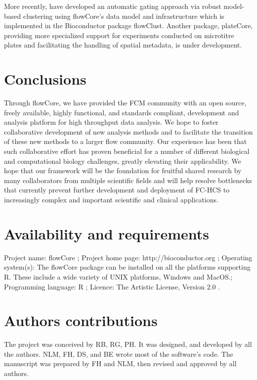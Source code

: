 \documentclass[10pt]{bmc_article}
\newcommand{\Rpackage}[1]{{\textsf{#1}}}
\newenvironment{bmcformat}{\begin{raggedright}\baselineskip20pt\sloppy\setboolean{publ}{false}}{\end{raggedright}\baselineskip20pt\sloppy}
\begin{document}
\begin{bmcformat}
More recently, \cite{lo2008agf} have developed an automatic gating
approach via robust model-based clustering using \Rpackage{flowCore}'s
data model and infrastructure which is implemented in the Bioconductor
package \Rpackage{flowClust}. Another package, \Rpackage{plateCore},
providing more specialized support for experiments conducted on
microtitre plates and facilitating the handling of spatial metadata,
is under development.
    

\section*{Conclusions}
Through \Rpackage{flowCore}, we have provided the FCM community with
an open source, freely available, highly functional, and standards
compliant, development and analysis platform for high throughput data
analysis.  We hope to foster collaborative development of new analysis
methods and to facilitate the transition of these new methods to a
larger flow community.  Our experience has been that such
collaborative effort has proven beneficial for a number of different
biological and computational biology challenges, greatly elevating
their applicability.  We hope that our framework will be the
foundation for fruitful shared research by many collaborators from
multiple scientific fields and will help resolve bottlenecks that
currently prevent further development and deployment of FC-HCS to
increasingly complex and important scientific and clinical
applications.

\section*{Availability and requirements}
Project name: flowCore ;
Project home page: http://bioconductor.org ;
Operating system(s): The flowCore package can be installed on all the 
platforms supporting R. These include a wide variety of UNIX platforms, Windows and MacOS.;  
Programming language: R ;
Licence: The Artistic License, Version 2.0 .

    
\section*{Authors contributions}
The project was conceived by RB, RG, PH. It was designed, and
developed by all the authors.  NLM, FH, DS, and BE wrote most of the
software’s code. The manuscript was prepared by FH and NLM, then
revised and approved by all authors.


\end{bmcformat}
\end{document}

